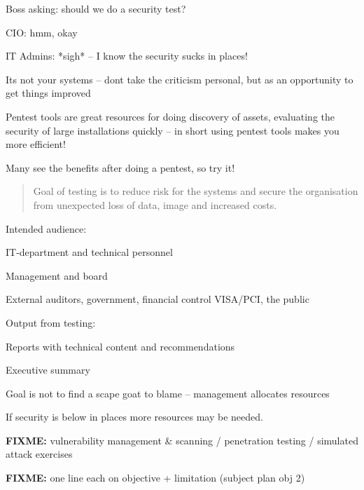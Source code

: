 \documentclass[Screen16to9,17pt]{foils}
\begin{document}
\begin{list2}
\item Boss asking: should we do a security test?
\item CIO: hmm, okay
\item IT Admins: *sigh* -- I know the security sucks in places!
\item Its not your systems -- dont take the criticism personal, but as an opportunity to get things improved
\vskip 1cm
\item Pentest tools are great resources for doing discovery of assets, evaluating the security of large installations quickly -- in short using pentest tools makes you more efficient!
\end{list2}

\centerline{\Large Many see the benefits after doing a pentest, so try it!}


\begin{quote}
Goal of testing is to reduce risk for the systems and secure the organisation\\ from unexpected loss of data, image and increased costs.
\end{quote}

\begin{list1}
\item Intended audience:
\begin{list2}
\item IT-department and technical personnel
\item Management and board
\item External auditors, government, financial control VISA/PCI, the public
\end{list2}
\item Output from testing:
\begin{list2}
\item Reports with technical content and recommendations
\item Executive summary
\end{list2}
\end{list1}

Goal is not to find a scape goat to blame -- management allocates resources

If security is below in places more resources may be needed.

\begin{list2}
\item \textbf{FIXME:} vulnerability management \& scanning / penetration testing / simulated attack exercises
\item \textbf{FIXME:} one line each on objective + limitation (subject plan obj 2)
\end{list2}
\end{document}
